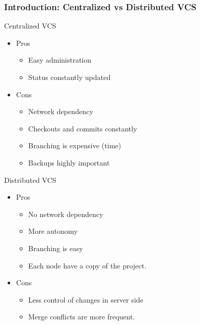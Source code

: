 \begin{frame}

\frametitle{Introduction: Centralized vs Distributed VCS}

\begin{multicols}{2}

Centralized VCS

\begin{itemize}
\item {Pros
\begin{itemize}
\item Easy administration
\item Status constantly updated
\end{itemize}
}
\item {Cons
\begin{itemize}
\item Network dependency
\item Checkouts and commits constantly
\item Branching is expensive (time)
\item Backups highly important
\end{itemize}

}
\end{itemize}


Distributed VCS

\begin{itemize}
\item {Pros
\begin{itemize}
\item No network dependency
\item More autonomy
\item Branching is easy
\item Each node have a copy of the project.
\end{itemize}
}
\item {Cons
\begin{itemize}
\item Less control of changes in server side
\item Merge conflicts are more frequent.
\end{itemize}

}
\end{itemize}

\end{multicols}

\end{frame}


